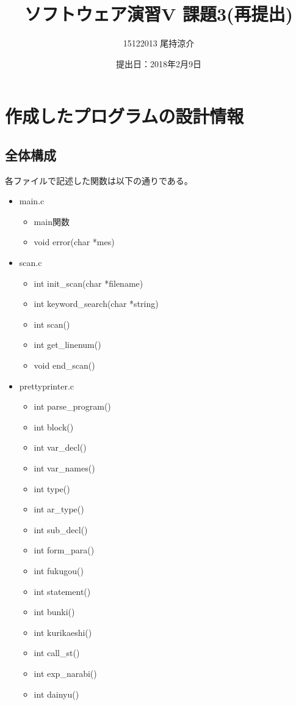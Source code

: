 \documentclass{jarticle}
\title{ソフトウェア演習V 課題3(再提出)}
\author{15122013 尾持涼介}
\date{提出日：2018年2月9日}
\makeatletter
\def\maketitle{%
\null
\thispagestyle{empty}%
\vfill
\begin{center}\leavevmode
\normalfont
{\LARGE \@title\par}%
\vskip 1cm
{\Large \@author\par}%
\vskip 1cm
{\Large \@date\par}%
\end{center}%
\vfill
\null
\@thanks%
\cleardoublepage
}
\makeatother
\begin{document}
\maketitle

\section{作成したプログラムの設計情報}
\subsection{全体構成}
各ファイルで記述した関数は以下の通りである。
\begin{itemize}
  \item main.c
  \begin{itemize}
    \item main関数
    \item void error(char *mes)
  \end{itemize}
  \item scan.c
  \begin{itemize}
    \item int init\_scan(char *filename)
    \item int keyword\_search(char *string)
    \item int scan()
    \item int get\_linenum()
    \item void end\_scan()
  \end{itemize}
  \item prettyprinter.c
  \begin{itemize}
    \item int parse\_program()
    \item int block()
    \item int var\_decl()
    \item int var\_names()
    \item int type()
    \item int ar\_type()
    \item int sub\_decl()
    \item int form\_para()
    \item int fukugou()
    \item int statement()
    \item int bunki()
    \item int kurikaeshi()
    \item int call\_st()
    \item int exp\_narabi()
    \item int dainyu()

\end{itemize}
\end{itemize}
\end{document}
